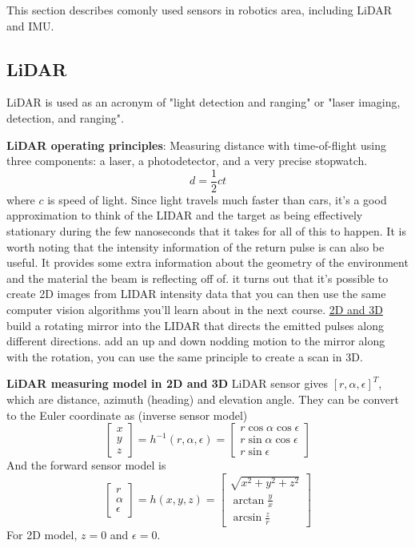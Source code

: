 This section describes comonly used sensors in robotics area, including LiDAR and IMU.

\subsection{LiDAR}
LiDAR is used as an acronym of "light detection and ranging" or "laser imaging, detection, and ranging".

\textbf{LiDAR operating principles}: Measuring distance with time-of-flight using three components: a laser, a photodetector, and a very precise stopwatch.
\begin{equation}
    d = \frac{1}{2} ct
\end{equation}
where $c$ is speed of light. Since light travels much faster than cars, it's a good approximation to think of the LIDAR and the target as being effectively stationary during the few nanoseconds that it takes for all of this to happen. It is worth noting that the intensity information of the return pulse is can also be useful. It provides some extra information about the geometry of the environment and the material the beam is reflecting off of.  it turns out that it's possible to create 2D images from LIDAR intensity data that you can then use the same computer vision algorithms you'll learn about in the next course. \underline{2D and 3D} build a rotating mirror into the LIDAR that directs the emitted pulses along different directions. add an up and down nodding motion to the mirror along with the rotation, you can use the same principle to create a scan in 3D.

\textbf{LiDAR measuring model in 2D and 3D}
LiDAR sensor gives $[r,\alpha,\epsilon]^T$, which are distance, azimuth (heading) and elevation angle. They can be convert to the Euler coordinate as (inverse sensor model)
\begin{equation}
    \left[ \begin{array}{c}
        x \\
        y  \\ 
        z\end{array} \right] = h^{-1}(r,\alpha,\epsilon)=
        \left[ \begin{array}{c}
            r\cos\alpha\cos\epsilon \\
            r\sin\alpha\cos\epsilon  \\ 
            r\sin\epsilon \end{array} \right]
\end{equation}
And the forward sensor model is
\begin{equation}
    \left[ \begin{array}{c}
        r \\
        \alpha  \\ 
        \epsilon\end{array} \right] = h(x,y,z)=
        \left[ \begin{array}{c}
            \sqrt{x^2+y^2+z^2} \\
            \arctan\frac{y}{x}  \\ 
            \arcsin\frac{z}{r} \end{array} \right]
\end{equation}
For 2D model, $z=0$ and $\epsilon=0$.

